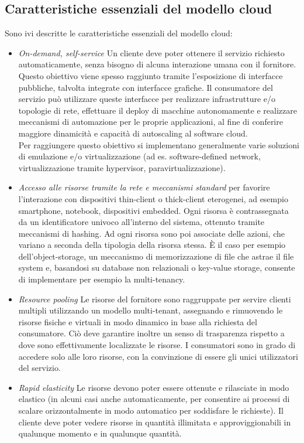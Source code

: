 \documentclass[../main.tex]{subfiles}
\begin{document}
\subsection{Caratteristiche essenziali del modello cloud}
Sono ivi descritte le caratteristiche essenziali del modello cloud:
\begin{itemize}
\item \textit{On-demand, self-service} Un cliente deve poter ottenere il servizio richiesto automaticamente, senza bisogno di alcuna interazione umana con il fornitore.
Questo obiettivo viene spesso raggiunto tramite l'esposizione di interfacce pubbliche, talvolta integrate con interfacce grafiche. Il consumatore del servizio può utilizzare queste interfacce per realizzare infrastrutture e/o topologie di rete, effettuare il deploy di macchine autonomamente e realizzare meccanismi di automazione per le proprie applicazioni, al fine di conferire maggiore dinamicità e capacità di autoscaling al software cloud.\\Per raggiungere questo obiettivo si implementano generalmente varie soluzioni di emulazione e/o virtualizzazione (ad es. software-defined network, virtualizzazione tramite hypervisor, paravirtualizzazione).
\item \textit{Accesso alle risorse tramite la rete e meccanismi standard} per favorire l'interazione con dispositivi thin-client o thick-client eterogenei, ad esempio smartphone, notebook, dispositivi embedded. Ogni risorsa è contrassegnata da un identificatore univoco all'interno del sistema, ottenuto tramite meccanismi di hashing. Ad ogni risorsa sono poi associate delle azioni, che variano a seconda della tipologia della risorsa stessa.
\`E il caso per esempio dell'object-storage, un meccanismo di memorizzazione di file che astrae il file system e, basandosi su database non relazionali o key-value storage, consente di implementare per esempio la multi-tenancy. %
\item \textit{Resource pooling} Le risorse del fornitore sono raggruppate per servire clienti multipli utilizzando un modello multi-tenant, assegnando e rimuovendo le risorse fisiche e virtuali in modo dinamico in base alla richiesta del consumatore.
Ciò deve garantire inoltre un senso di trasparenza rispetto a dove sono effettivamente localizzate le risorse.
I consumatori sono in grado di accedere solo alle loro risorse, con la convinzione di essere gli unici utilizzatori del servizio. 
\item \textit{Rapid elasticity} Le risorse devono poter essere ottenute e rilasciate in modo elastico (in alcuni casi anche automaticamente, per consentire ai processi di scalare orizzontalmente in modo automatico per soddisfare le richieste). Il cliente deve poter vedere risorse in quantità illimitata e approviggionabili in qualunque momento e in qualunque quantità.

\end{itemize}
\end{document}
